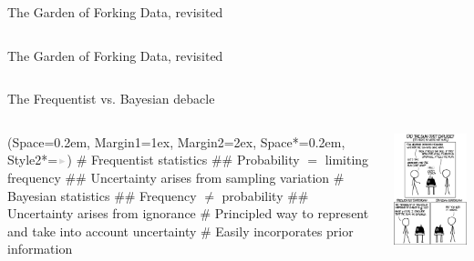 \documentclass[12pt, aspectratio=149]{beamer}
\newcommand{\listSpace}{0.2em}
\theoremstyle{plain}
\begin{document}
\begin{frame}[fragile]{The Garden of Forking Data, revisited}
	\inputminted[fontsize=\tiny]{python}{../code/marbles.py}
\end{frame}

\begin{frame}[fragile]{The Garden of Forking Data, revisited}
	\inputminted[fontsize=\tiny]{python}{../code/forking_data.py}
\end{frame}

\begin{frame}[fragile]{The Frequentist vs. Bayesian debacle}
	\begin{columns}
		\begin{column}{0.7\linewidth}
			\begin{easylist}[itemize]
				\ListProperties(Space=\listSpace, Margin1=1ex, Margin2=2ex, Space*=\listSpace, Style2*=$\color{bggraydark}\blacktriangleright$\space)
				# Frequentist statistics
				## Probability $=$ limiting frequency
				## Uncertainty arises from sampling variation
				# Bayesian statistics
				## Frequency $\neq$ probability
				## Uncertainty arises from ignorance
				# Principled way to represent and take into account uncertainty
				# Easily incorporates prior information
			\end{easylist}
		\end{column}
		\begin{column}{0.3\textwidth}
			\includegraphics[height=0.7\textheight]{figs/relevant_xkcd.png}

\end{column}
\end{columns}
\end{frame}
\end{document}

